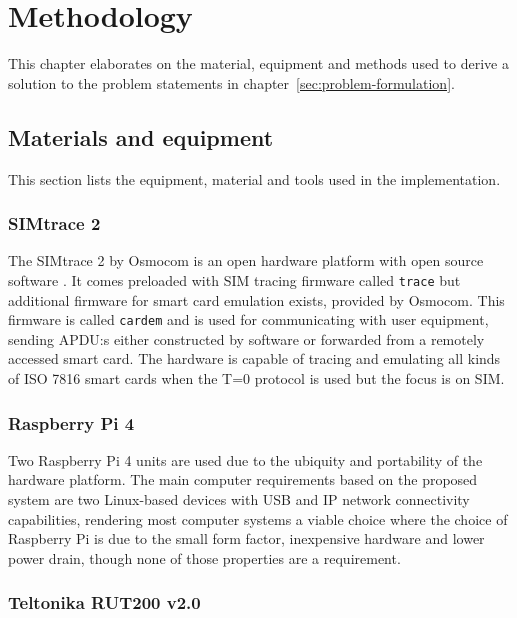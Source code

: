\chapter{Methodology}

This chapter elaborates on the material, equipment and methods used
to derive a solution to the problem statements in chapter~\ref{sec:problem-formulation}.

\section{Materials and equipment}
\label{sec:materials-and-equipment}

This section lists the equipment, material and tools used in the
implementation.

\subsection{SIMtrace 2}

The SIMtrace 2 by Osmocom is an open hardware platform with open
source software \cite{simtrace}. It comes preloaded with SIM
tracing firmware called \verb|trace| \cite{simtrace-wiki} but
additional firmware for smart card emulation exists, provided by
Osmocom. This firmware is called \verb|cardem|
\cite{simtrace-wiki} and is used for communicating with user
equipment, sending APDU:s either constructed by software or
forwarded from a remotely accessed smart card. The hardware is
capable of tracing and emulating all kinds of ISO 7816
\cite{etsi-ts-102-221} smart cards when the T=0 protocol is used
\cite{simtrace-wiki} but the focus is on SIM.

\subsection{Raspberry Pi 4}

Two Raspberry Pi 4 units are used due to the ubiquity and
portability of the hardware platform. The main computer
requirements based on the proposed system are two Linux-based
devices with USB and IP network connectivity capabilities,
rendering most computer systems a viable choice where the choice
of Raspberry Pi is due to the small form factor, inexpensive
hardware and lower power drain, though none of those properties
are a requirement.

\subsection{Teltonika RUT200 v2.0}

